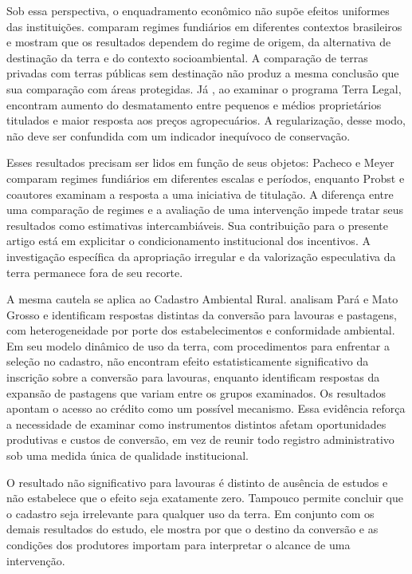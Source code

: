 Sob essa perspectiva, o enquadramento econômico não supõe efeitos uniformes das instituições.  comparam regimes fundiários em diferentes contextos brasileiros e mostram que os resultados dependem do regime de origem, da alternativa de destinação da terra e do contexto socioambiental. A comparação de terras privadas com terras públicas sem destinação não produz a mesma conclusão que sua comparação com áreas protegidas. Já , ao examinar o programa Terra Legal, encontram aumento do desmatamento entre pequenos e médios proprietários titulados e maior resposta aos preços agropecuários. A regularização, desse modo, não deve ser confundida com um indicador inequívoco de conservação.

Esses resultados precisam ser lidos em função de seus objetos: Pacheco e Meyer comparam regimes fundiários em diferentes escalas e períodos, enquanto Probst e coautores examinam a resposta a uma iniciativa de titulação. A diferença entre uma comparação de regimes e a avaliação de uma intervenção impede tratar seus resultados como estimativas intercambiáveis. Sua contribuição para o presente artigo está em explicitar o condicionamento institucional dos incentivos. A investigação específica da apropriação irregular e da valorização especulativa da terra permanece fora de seu recorte.

A mesma cautela se aplica ao Cadastro Ambiental Rural.  analisam Pará e Mato Grosso e identificam respostas distintas da conversão para lavouras e pastagens, com heterogeneidade por porte dos estabelecimentos e conformidade ambiental. Em seu modelo dinâmico de uso da terra, com procedimentos para enfrentar a seleção no cadastro, não encontram efeito estatisticamente significativo da inscrição sobre a conversão para lavouras, enquanto identificam respostas da expansão de pastagens que variam entre os grupos examinados. Os resultados apontam o acesso ao crédito como um possível mecanismo. Essa evidência reforça a necessidade de examinar como instrumentos distintos afetam oportunidades produtivas e custos de conversão, em vez de reunir todo registro administrativo sob uma medida única de qualidade institucional.

O resultado não significativo para lavouras é distinto de ausência de estudos e não estabelece que o efeito seja exatamente zero. Tampouco permite concluir que o cadastro seja irrelevante para qualquer uso da terra. Em conjunto com os demais resultados do estudo, ele mostra por que o destino da conversão e as condições dos produtores importam para interpretar o alcance de uma intervenção.


